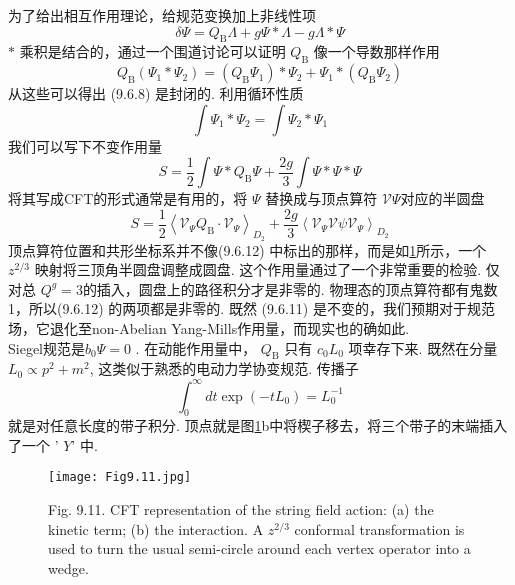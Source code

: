 为了给出相互作用理论，给规范变换加上非线性项
\begin{equation}
	\delta \Psi=Q_{\mathrm{B}} \Lambda+g \Psi * \Lambda-g \Lambda * \Psi
\end{equation}
$*$ 乘积是结合的，通过一个围道讨论可以证明 $Q_{\mathrm{B}}$ 像一个导数那样作用
\begin{equation}
	Q_{\mathrm{B}}\left(\Psi_{1} * \Psi_{2}\right)=\left(Q_{\mathrm{B}} \Psi_{1}\right) * \Psi_{2}+\Psi_{1} *\left(Q_{\mathrm{B}} \Psi_{2}\right)
\end{equation}
从这些可以得出 (9.6.8) 是封闭的. 利用循环性质
\begin{equation}
	\int \Psi_{1} * \Psi_{2}=\int \Psi_{2} * \Psi_{1}
\end{equation}
我们可以写下不变作用量
\begin{equation}
	S=\frac{1}{2} \int \Psi * Q_{\mathrm{B}} \Psi+\frac{2 g}{3} \int \Psi * \Psi * \Psi
\end{equation}
将其写成CFT的形式通常是有用的，将 $\Psi$ 替换成与顶点算符 $\mathscr{V} \Psi$对应的半圆盘
\begin{equation}
	S=\frac{1}{2}\left\langle\mathscr{V}_{\Psi} Q_{\mathrm{B}} \cdot \mathscr{V}_{\Psi}\right\rangle_{D_{2}}+\frac{2 g}{3}\left\langle\mathscr{V}_{\Psi} \mathscr{V} \psi \mathscr{V}_{\Psi}\right\rangle_{D_{2}}
\end{equation}
顶点算符位置和共形坐标系并不像(9.6.12) 中标出的那样，而是如\ref{Fig9.11}所示，一个 $z^{2 / 3}$ 映射将三顶角半圆盘调整成圆盘. 这个作用量通过了一个非常重要的检验. 仅对总 $Q^{g}=3$的插入，圆盘上的路径积分才是非零的. 物理态的顶点算符都有鬼数1，所以(9.6.12) 的两项都是非零的. 既然 (9.6.11) 是不变的，我们预期对于规范场，它退化至non-Abelian Yang-Mills作用量，而现实也的确如此.\\
Siegel规范是$b_{0} \Psi=0 $ . 在动能作用量中， $Q_{\mathrm{B}}$ 只有 $c_{0} L_{0}$ 项幸存下来. 既然在分量 $L_{0} \propto p^{2}+m^{2}$, 这类似于熟悉的电动力学协变规范. 传播子
\begin{equation}
	\int_{0}^{\infty} d t \exp \left(-t L_{0}\right)=L_{0}^{-1}
\end{equation}
就是对任意长度的带子积分. 顶点就是图\ref{Fig9.11}b中将楔子移去，将三个带子的末端插入了一个 ' $Y$' 中.

\begin{figure}
	\begin{center}
		\texttt{[image: Fig9.11.jpg]}\\
		\caption{Fig. 9.11. CFT representation of the string field action: (a) the kinetic term; (b) the interaction. A $z^{2 / 3}$ conformal transformation is used to turn the usual semi-circle around each vertex operator into a wedge.}\label{Fig9.11}
	\end{center}
\end{figure}

